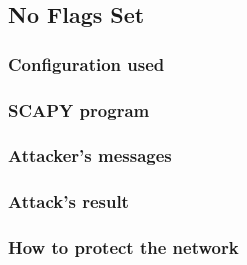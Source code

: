 \subsection{No Flags Set}
\subsubsection{Configuration used}

\subsubsection{SCAPY program}


\subsubsection{Attacker's messages}

\subsubsection{Attack's result}


\subsubsection{How to protect the network}

